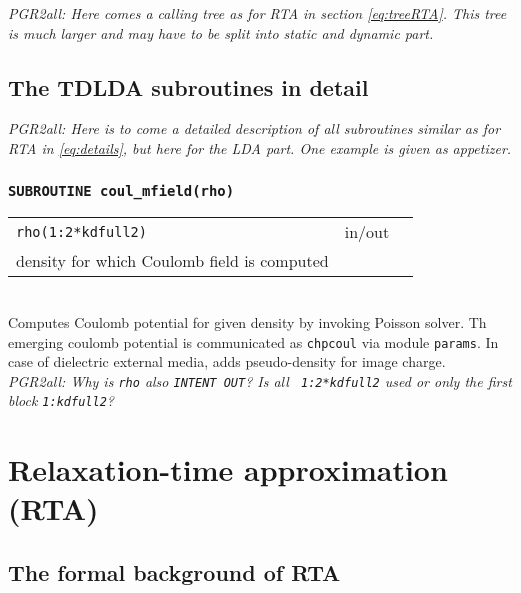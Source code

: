 \documentclass[final,1p]{elsarticle}
\newcommand{\PGRcomm}[1]{{\color{blue}\small\em PGR2all: #1}}
\begin{document}
\PGRcomm{Here comes a calling tree as for RTA in section
  \ref{eq:treeRTA}. This tree is much larger and may have to be
  split into static and dynamic part.
}

\subsection{The TDLDA subroutines in detail}
\label{eq:detailsTDLDA}


\PGRcomm{Here is to come a detailed description of all subroutines
  similar as for RTA in \ref{eq:details}, but here for the LDA part.
One example is given as appetizer.
}

\subsubsection*{\tt SUBROUTINE coul\_mfield(rho)}
\begin{tabular}{lcl}
 {\tt rho(1:2*kdfull2)} & in/out & \\ density for which Coulomb field
 is computed
\end{tabular}
\\[4pt]
Computes Coulomb potential for given density by invoking
Poisson solver.
Th emerging coulomb potential is communicated as {\tt chpcoul}
via module {\tt params}.
In case of dielectric external media, adds pseudo-density for image
charge.
\\
\PGRcomm{Why is {\tt rho} also {\tt INTENT OUT}? Is all {\tt
    1:2*kdfull2} used or only the first block {\tt 1:kdfull2}?}







\section{Relaxation-time approximation (RTA)}


\subsection{The formal background of RTA}
\end{document}
